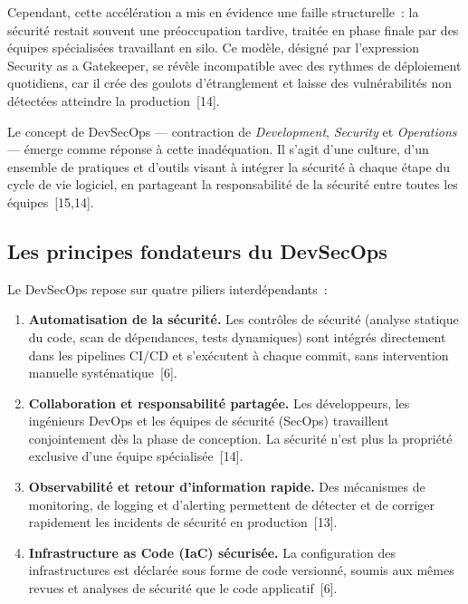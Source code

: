 Cependant, cette accélération a mis en évidence une faille structurelle~: la
sécurité restait souvent une préoccupation tardive, traitée en phase finale par
des équipes spécialisées travaillant en silo. Ce modèle, désigné par
l'expression \og{}Security as a Gatekeeper\fg{}, se révèle incompatible avec
des rythmes de déploiement quotidiens, car il crée des goulots d'étranglement
et laisse des vulnérabilités non détectées atteindre la production~[14].

Le concept de DevSecOps --- contraction de \emph{Development}, \emph{Security}
et \emph{Operations} --- émerge comme réponse à cette inadéquation. Il s'agit
d'une culture, d'un ensemble de pratiques et d'outils visant à intégrer la
sécurité à chaque étape du cycle de vie logiciel, en partageant la
responsabilité de la sécurité entre toutes les équipes~[15,14].

\subsection{Les principes fondateurs du DevSecOps}

Le DevSecOps repose sur quatre piliers interdépendants~:

\begin{enumerate}[leftmargin=*, label=\textbf{\arabic*.}]

  \item \textbf{Automatisation de la sécurité.} Les contrôles de sécurité
    (analyse statique du code, scan de dépendances, tests dynamiques) sont
    intégrés directement dans les pipelines CI/CD et s'exécutent à chaque
    commit, sans intervention manuelle systématique~[6].

  \item \textbf{Collaboration et responsabilité partagée.} Les développeurs,
    les ingénieurs DevOps et les équipes de sécurité (SecOps) travaillent
    conjointement dès la phase de conception. La sécurité n'est plus la
    propriété exclusive d'une équipe spécialisée~[14].

  \item \textbf{Observabilité et retour d'information rapide.} Des mécanismes
    de monitoring, de logging et d'alerting permettent de détecter et de
    corriger rapidement les incidents de sécurité en production~[13].

  \item \textbf{Infrastructure as Code (IaC) sécurisée.} La configuration des
    infrastructures est déclarée sous forme de code versionné, soumis aux mêmes
    revues et analyses de sécurité que le code applicatif~[6].

\end{enumerate}

